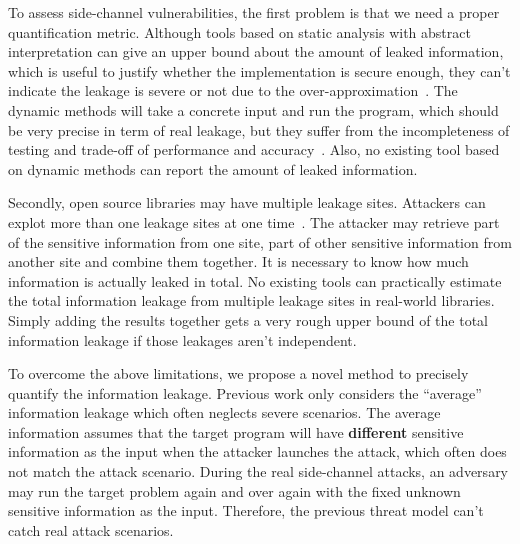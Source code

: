 To assess side-channel vulnerabilities, the first problem is that we need a proper quantification metric.
Although tools based on static analysis with abstract interpretation can give an upper bound
about the amount of leaked information, 
which is useful to justify whether the implementation is secure enough, 
they can’t indicate the leakage is severe or not due to the over-approximation~\cite{182946}. 
The dynamic methods will take a concrete input and run the program, which should be very precise 
in term of real leakage,
but they suffer from the incompleteness of testing and trade-off of performance and accuracy~\cite{}.
Also, no existing tool based on dynamic methods can report the amount of leaked information.

Secondly, open source libraries may have multiple leakage sites. 
Attackers can explot more than one leakage
sites at one time~\cite{191010,7163052,hornby2011side}. 
The attacker may retrieve part of the sensitive information from one site, part of other sensitive
information from another site and combine them together.
It is necessary to know how much information is actually leaked in total. 
No existing tools can practically estimate the total information leakage from multiple leakage sites in real-world libraries.
Simply adding the results together gets a very rough upper bound of the total information leakage if those 
leakages aren’t independent. 


To overcome the above limitations, we propose a novel method
to precisely quantify the information leakage. Previous work only considers the
``average'' information leakage which often neglects severe scenarios.
The average information assumes that the target program will have \textbf{different} sensitive 
information as the input when the attacker launches the attack,
which often does not match the attack scenario. During the real side-channel
attacks, an adversary may run the target problem again and over again with the 
fixed unknown sensitive information as the input. Therefore, the previous
threat model can't catch real attack scenarios.

